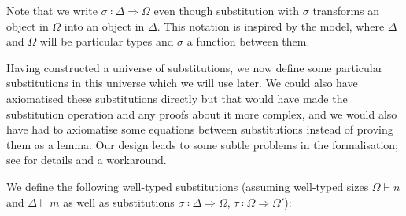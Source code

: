 Note that we write $σ ∶ Δ ⇒ Ω$ even though substitution with $σ$ transforms an
object in $Ω$ into an object in $Δ$. This notation is inspired by the model,
where $Δ$ and $Ω$ will be particular types and $σ$ a function between them.

Having constructed a universe of substitutions, we now define some particular
substitutions in this universe which we will use later. We could also have
axiomatised these substitutions directly but that would have made the
substitution operation and any proofs about it more complex, and we would also
have had to axiomatise some equations between substitutions instead of proving
them as a lemma. Our design leads to some subtle problems in the formalisation;
see  for details and a workaround.

We define the following well-typed substitutions (assuming well-typed sizes $Ω ⊢
n$ and $Δ ⊢ m$ as well as substitutions $σ ∶ Δ ⇒ Ω$, $τ ∶ Ω ⇒ Ω′$):
